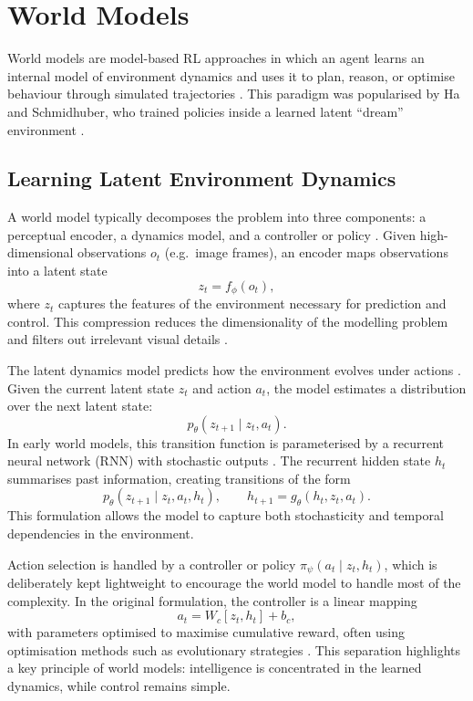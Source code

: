 \section{World Models}

World models are model-based RL approaches in which an agent learns an
internal model of environment dynamics and uses it to plan, reason, or
optimise behaviour through simulated trajectories
\cite{sutton2018reinforcement, moerland2022modelbasedreinforcementlearningsurvey, ha2018worldmodels}. This paradigm was popularised by Ha and Schmidhuber, who trained policies inside a learned latent ``dream'' environment \cite{ha2018worldmodels}.

\subsection{Learning Latent Environment Dynamics}

A world model typically decomposes the problem into three components: a perceptual encoder, a dynamics model, and a controller or policy \cite{ha2018worldmodels, hafner2019planet}. Given high-dimensional observations $o_t$ (e.g.\ image frames), an encoder maps observations into a latent state
\[
z_t = f_\phi(o_t),
\]
where $z_t$ captures the features of the environment necessary for prediction and control. This compression reduces the dimensionality of the modelling problem and filters out irrelevant visual details \cite{ha2018worldmodels, hafner2019planet}.

The latent dynamics model predicts how the environment evolves under actions \cite{hafner2019planet,hafner2020dreamer}. Given the current latent state $z_t$ and action $a_t$, the model estimates a distribution over the next latent state:
\[
p_\theta(z_{t+1} \mid z_t, a_t).
\]
In early world models, this transition function is parameterised by a recurrent neural network (RNN) with stochastic outputs \cite{ha2018worldmodels}. The recurrent hidden state $h_t$ summarises past information, creating transitions of the form
\[
p_\theta(z_{t+1} \mid z_t, a_t, h_t),
\qquad
h_{t+1} = g_\theta(h_t, z_t, a_t).
\]
This formulation allows the model to capture both stochasticity and temporal dependencies in the environment.

Action selection is handled by a controller or policy $\pi_\psi(a_t \mid z_t, h_t)$, which is deliberately kept lightweight to encourage the world model to handle most of the complexity. In the original formulation, the controller is a linear mapping
\[
a_t = W_c [z_t, h_t] + b_c,
\]
with parameters optimised to maximise cumulative reward, often using optimisation methods such as evolutionary strategies \cite{salimans2017evolutionstrategiesscalablealternative, ha2018worldmodels}. This separation highlights a key principle of world models: intelligence is concentrated in the learned dynamics, while control remains simple.

